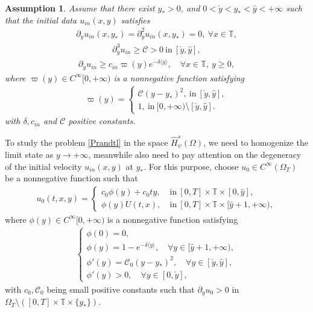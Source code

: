 \documentclass{amsart}
\numberwithin{equation}{section}
\newtheorem{assumption}{Assumption}[section]
\newcommand\y{{{\langle y \rangle}}}
\begin{document}
\begin{assumption}\label{inA'}
Assume that there exist $y_\ast>0$, and $0<\check{y}<y_{*}<\hat{y}<+\infty$ such that
the initial data $u_{in}(x,y)$ satisfies
\begin{align}\label{inA1}
\partial_{y}u_{in}(x,y_{*})=\partial_{y}^{2}u_{in}(x,y_{*})=0,~\forall x\in\mathbb{T},
\end{align}
\begin{align}\label{inA2}
\partial_{y}^{3}u_{in}\geq\mathcal{C}>0~\text{in}~[\check{y},\hat{y}],
\end{align}
\begin{align}\label{inA3}
\partial_{y}u_{in}\geq c_{in}\varpi (y) e^{-\delta\y}, \quad \forall x\in  \mathbb{T}, ~y\ge 0,
\end{align}
where $\varpi(y)\in C^\infty[0,+\infty)$ is a nonnegative function satisfying
\begin{align}\label{pi}
\varpi(y)=
\begin{cases}
\mathcal{C}(y-y_{*})^{2},~\text{in}~[\check{y},\hat{y}],\\
1,~\text{in}~[0,+\infty)\setminus[\check{y},\hat{y}].
\end{cases}
\end{align}
with $\delta, c_{in}$ and $ \mathcal{C}$ positive constants.

\end{assumption}



To study the  problem \eqref{Prandtl} in the space $\hat{H}_{\psi}^{s}(\Omega)$, we need to homogenize the limit state as $y\to +\infty$,  meanwhile also need to pay attention on the degeneracy of the initial velocity $u_{in}(x,y)$ at $y_{*}$. For this purpose, choose $u_{0}\in C^{\infty}(\Omega_{T})$ be a nonnegative function such that
\begin{align}\label{u0}
u_{0}(t,x,y)=
\begin{cases}
c_{0}\phi(y)+c_{0}ty,~&\text{in}~[0,T]\times\mathbb{T}\times[0,\hat{y}],\\
\phi(y)U(t,x),  ~&\text{in}~[0,T]\times\mathbb{T}\times[\hat{y}+1,+\infty),
\end{cases}
\end{align}
where $\phi(y)\in C^{\infty}[0,+\infty)$ is a nonnegative  function satisfying
\begin{align}\label{phi}
\begin{cases}
\phi(0)=0,\\
\phi(y)=1-e^{-\delta\y},\quad
\forall y\in[\hat{y}+1,+\infty),\\
\phi'(y)=\mathcal{C}_{0}(y-y_{*})^{2},\quad  \forall y\in[\check{y},\hat{y}],\\
\phi'(y)>0, \quad \forall y\in[0,\check{y}],
\end{cases}
\end{align}
with $c_{0}, \mathcal{C}_{0}$ being small positive constants such that $\partial_{y}u_{0}>0$ in $\Omega_{T}\setminus ([0,T]\times\mathbb{T}\times\{y_{*}\})$.
\end{document}
